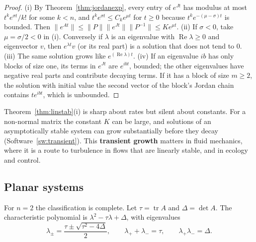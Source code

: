\documentclass[11pt,a4paper]{article}
\numberwithin{equation}{section}
\DeclareMathOperator{\tr}{tr}
\DeclareMathOperator{\Real}{Re}
\theoremstyle{definition}
\begin{document}
\begin{proof}
(i) By Theorem~\ref{thm:jordanexp}, every entry of $e^{Jt}$ has modulus at most $t^ke^{\sigma t}/k!$ for some $k < n$, and $t^ke^{\sigma t} \leq C_ke^{\mu t}$ for $t \geq 0$ because $t^ke^{-(\mu - \sigma)t}$ is bounded. Then
$\|e^{At}\| \leq \|P\|\|e^{Jt}\|\|P^{-1}\| \leq Ke^{\mu t}$. (ii) If $\sigma < 0$, take $\mu = \sigma/2 < 0$ in (i). Conversely if $\lambda$ is an eigenvalue with $\Real\lambda \geq 0$ and eigenvector $v$, then $e^{\lambda t}v$ (or its
real part) is a solution that does not tend to $0$. (iii) The same solution grows like $e^{(\Real\lambda)t}$. (iv) If an eigenvalue $ib$ has only blocks of size one, its terms in $e^{Jt}$ are $e^{ibt}$,
bounded; the other eigenvalues have negative real parts and contribute decaying terms. If it has a block of size $m \geq 2$, the solution with initial value the second vector
of the block's Jordan chain contains $te^{ibt}$, which is unbounded.
\end{proof}

Theorem~\ref{thm:linstab}(i) is sharp about rates but silent about constants. For a non-normal matrix the constant $K$ can be large, and solutions of an asymptotically stable system
can grow substantially before they decay (Software~\ref{sw:transient}). This \textbf{transient growth} matters in fluid mechanics, where it is a route to turbulence in flows that are
linearly stable, and in ecology and control.

\subsection{Planar systems}
\label{ssec:planar}

For $n = 2$ the classification is complete. Let $\tau = \tr A$ and $\Delta = \det A$. The characteristic polynomial is $\lambda^2 - \tau\lambda + \Delta$, with eigenvalues
\[
\lambda_\pm = \frac{\tau \pm \sqrt{\tau^2 - 4\Delta}}{2}, \qquad \lambda_+ + \lambda_- = \tau, \qquad \lambda_+\lambda_- = \Delta .
\]
\end{document}
